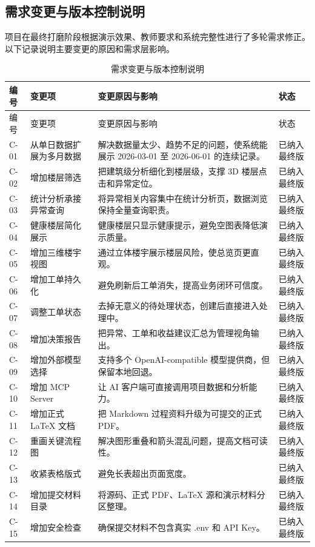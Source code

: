 \documentclass[12pt,a4paper]{ctexart}
\begin{document}
\subsection{需求变更与版本控制说明}
项目在最终打磨阶段根据演示效果、教师要求和系统完整性进行了多轮需求修正。以下记录说明主要变更的原因和需求层影响。
\begin{longtable}{L{1.7cm}L{4.2cm}L{6.6cm}L{3.0cm}}
\caption{需求变更与版本控制说明}\\
\toprule
编号 & 变更项 & 变更原因与影响 & 状态 \\
\midrule
\endfirsthead
\toprule
编号 & 变更项 & 变更原因与影响 & 状态 \\
\midrule
\endhead
C-01 & 从单日数据扩展为多月数据 & 解决数据量太少、趋势不足的问题，使系统能展示 2026-03-01 至 2026-06-01 的连续记录。 & 已纳入最终版 \\
C-02 & 增加楼层筛选 & 把建筑级分析细化到楼层级，支撑 3D 楼层点击和异常定位。 & 已纳入最终版 \\
C-03 & 统计分析承接异常查询 & 将异常相关内容集中在统计分析页，数据浏览保持全量查询职责。 & 已纳入最终版 \\
C-04 & 健康楼层简化展示 & 健康楼层只显示健康提示，避免空图表降低演示质量。 & 已纳入最终版 \\
C-05 & 增加三维楼宇视图 & 通过立体楼宇展示楼层风险，使总览页更直观。 & 已纳入最终版 \\
C-06 & 增加工单持久化 & 避免刷新后工单消失，提高业务闭环可信度。 & 已纳入最终版 \\
C-07 & 调整工单状态 & 去掉无意义的待处理状态，创建后直接进入处理中。 & 已纳入最终版 \\
C-08 & 增加决策报告 & 把异常、工单和收益建议汇总为管理视角输出。 & 已纳入最终版 \\
C-09 & 增加外部模型选择 & 支持多个 OpenAI-compatible 模型提供商，但保留本地回退。 & 已纳入最终版 \\
C-10 & 增加 MCP Server & 让 AI 客户端可直接调用项目数据和分析能力。 & 已纳入最终版 \\
C-11 & 增加正式 LaTeX 文档 & 把 Markdown 过程资料升级为可提交的正式 PDF。 & 已纳入最终版 \\
C-12 & 重画关键流程图 & 解决图形重叠和箭头混乱问题，提高文档可读性。 & 已纳入最终版 \\
C-13 & 收紧表格版式 & 避免长表超出页面宽度。 & 已纳入最终版 \\
C-14 & 增加提交材料目录 & 将源码、正式 PDF、LaTeX 源和演示材料分区整理。 & 已纳入最终版 \\
C-15 & 增加安全检查 & 确保提交材料不包含真实 .env 和 API Key。 & 已纳入最终版 \\
\bottomrule
\end{longtable}
\end{document}

